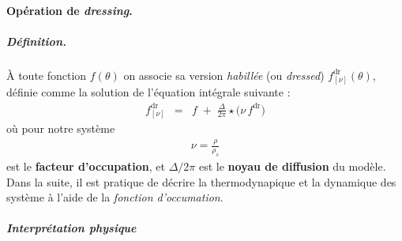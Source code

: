 \paragraph{Opération de \emph{dressing}.}
\subparagraph{Définition.}
À toute fonction $f(\theta)$ on associe sa version \emph{habillée} (ou \emph{dressed}) $f^{\mathrm{dr}}_{[\nu]}(\theta)$, définie comme la solution de l’équation intégrale suivante :
\begin{eqnarray}\label{eq:dessing}
	f^{\mathrm{dr}}_{[\nu]} & = & f  \;+\;\tfrac{\Delta}{2\pi}\star\bigl(\nu\,f^{\mathrm{dr}}\bigr) \label{eq:dressing}	
\end{eqnarray}
où pour notre système 
\begin{eqnarray}
	\nu = \frac{\rho}{\rho_s	}\label{eq:TBA-nu}
\end{eqnarray}
est le {\bf facteur d’occupation}, et $\Delta/2\pi$ est le {\bf noyau de diffusion} du modèle.
Dans la suite, il est pratique de décrire la thermodynapique et la dynamique des système à l'aide de la {\em fonction d'occumation}.


\subparagraph{Interprétation physique}

